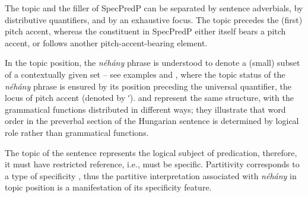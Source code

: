 \documentclass[output=paper]{langscibook}
\begin{document}
\noindent The topic and the filler of SpecPredP can be separated by sentence adverbials, by distributive quantifiers, and by an exhaustive focus. The topic precedes the (first) pitch accent, whereas the constituent in SpecPredP either itself bears a pitch accent, or follows another pitch-accent-bearing element.

In the topic position, the \textit{néhány} phrase is understood to denote a (small) subset of a contextually given set – see examples  and , where the topic status of the \textit{néhány} phrase is ensured by its position preceding the universal quantifier, the locus of pitch accent (denoted by ʹ).  and  represent the same structure, with the grammatical functions distributed in different ways; they illustrate that word order in the preverbal section of the Hungarian sentence is determined by logical role rather than grammatical functions.

\eal\label{kis-zet:ex:nehany diakkal}
\zl

\noindent The topic of the sentence represents the logical subject of predication, therefore, it must have restricted reference, i.e., must be specific. Partitivity corresponds to a type of specificity \citep{encc1991semantics,farkas2002specificity,kamp2019epistemic}, thus the partitive interpretation associated with \textit{néhány} in topic position is a manifestation of its specificity feature.
\end{document}
